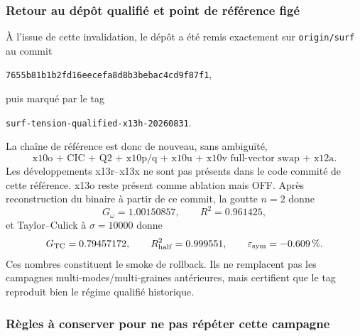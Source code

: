\documentclass[11pt,a4paper]{article}
\begin{document}
\subsubsection{Retour au dépôt qualifié et point de référence figé}

À l'issue de cette invalidation, le dépôt a été remis exactement sur \texttt{origin/surf} au commit
\begin{center}
\texttt{7655b81b1b2fd16eecefa8d8b3bebac4cd9f87f1},
\end{center}
puis marqué par le tag
\begin{center}
\texttt{surf-tension-qualified-x13h-20260831}.
\end{center}
La chaîne de référence est donc de nouveau, sans ambiguïté,
\begin{equation}
 \boxed{\text{x10o + CIC + Q2 + x10p/q + x10u + x10v full-vector swap + x12a}.}
\end{equation}
Les développements x13r--x13x ne sont pas présents dans le code commité de cette référence. x13o reste présent comme ablation mais OFF. Après reconstruction du binaire à partir de ce commit, la goutte $n=2$ donne
\begin{equation}
 G_{\omega}=1.00150857,
 \qquad
 R^2=0.961425,
\end{equation}
et Taylor--Culick à $\sigma=10000$ donne
\begin{equation}
 G_{\rm TC}=0.79457172,
 \qquad
 R^2_{\rm half}=0.999551,
 \qquad
 \varepsilon_{\rm sym}=-0.609\,\%.
\end{equation}
Ces nombres constituent le smoke de rollback. Ils ne remplacent pas les campagnes multi-modes/multi-graines antérieures, mais certifient que le tag reproduit bien le régime qualifié historique.

\subsubsection{Règles à conserver pour ne pas répéter cette campagne}
\end{document}
